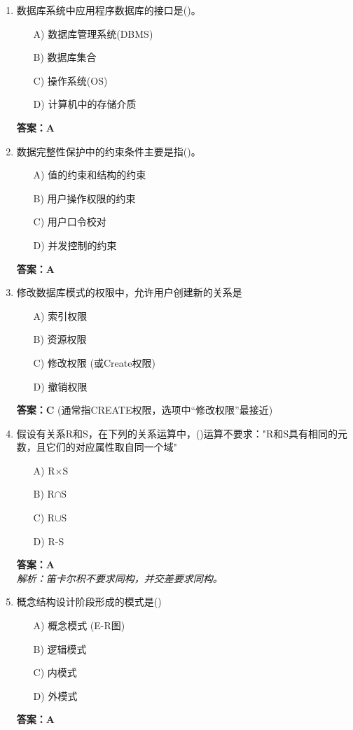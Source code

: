 \documentclass[a4paper,12pt]{article}
\begin{document}
\begin{enumerate}[label=\arabic*.]
\item 数据库系统中应用程序数据库的接口是()。
\begin{itemize}
    \item[A)] 数据库管理系统(DBMS)
    \item[B)] 数据库集合
    \item[C)] 操作系统(OS)
    \item[D)] 计算机中的存储介质
\end{itemize}
\textbf{答案：A}

\item 数据完整性保护中的约束条件主要是指()。
\begin{itemize}
    \item[A)] 值的约束和结构的约束
    \item[B)] 用户操作权限的约束
    \item[C)] 用户口令校对
    \item[D)] 并发控制的约束
\end{itemize}
\textbf{答案：A}

\item 修改数据库模式的权限中，允许用户创建新的关系是
\begin{itemize}
    \item[A)] 索引权限
    \item[B)] 资源权限
    \item[C)] 修改权限 (或Create权限)
    \item[D)] 撤销权限
\end{itemize}
\textbf{答案：C} (通常指CREATE权限，选项中“修改权限”最接近)

\item 假设有关系R和S，在下列的关系运算中，()运算不要求："R和S具有相同的元数，且它们的对应属性取自同一个域"
\begin{itemize}
    \item[A)] R$\times$S
    \item[B)] R$\cap$S
    \item[C)] R$\cup$S
    \item[D)] R-S
\end{itemize}
\textbf{答案：A} \\
\textit{解析：笛卡尔积不要求同构，并交差要求同构。}

\item 概念结构设计阶段形成的模式是()
\begin{itemize}
    \item[A)] 概念模式 (E-R图)
    \item[B)] 逻辑模式
    \item[C)] 内模式
    \item[D)] 外模式
\end{itemize}
\textbf{答案：A}


\end{enumerate}
\end{document}
